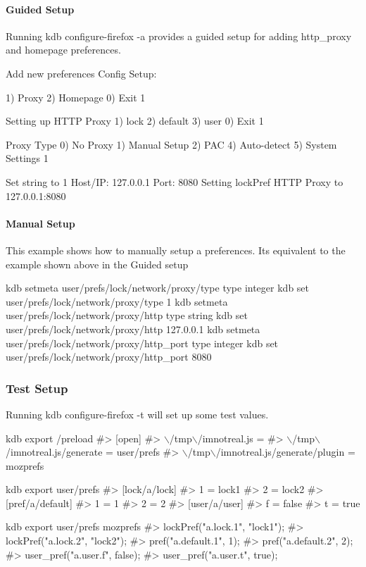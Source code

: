 \paragraph*{Guided Setup}

Running {\ttfamily kdb configure-\/firefox -\/a} provides a guided setup for adding http\+\_\+proxy and homepage preferences.


\begin{DoxyCode}
Add new preferences
Config Setup:

1) Proxy
2) Homepage
0) Exit
1

Setting up HTTP Proxy
1) lock
2) default
3) user
0) Exit
1

Proxy Type
0) No Proxy
1) Manual Setup
2) PAC
4) Auto-detect
5) System Settings
1

Set string to 1
Host/IP: 127.0.0.1
Port: 8080
Setting lockPref HTTP Proxy to 127.0.0.1:8080
\end{DoxyCode}


\paragraph*{Manual Setup}

This example shows how to manually setup a preferences. It\textquotesingle{}s equivalent to the example shown above in the {\ttfamily Guided setup}


\begin{DoxyCode}
kdb setmeta user/prefs/lock/network/proxy/type type integer
kdb set user/prefs/lock/network/proxy/type 1
kdb setmeta user/prefs/lock/network/proxy/http type string
kdb set user/prefs/lock/network/proxy/http 127.0.0.1
kdb setmeta user/prefs/lock/network/proxy/http\_port type integer
kdb set user/prefs/lock/network/proxy/http\_port 8080
\end{DoxyCode}


\subsubsection*{Test Setup}

Running {\ttfamily kdb configure-\/firefox -\/t} will set up some test values.


\begin{DoxyCode}
kdb export /preload
#> [open]
#> \(\backslash\)/tmp\(\backslash\)/imnotreal.js =
#> \(\backslash\)/tmp\(\backslash\)/imnotreal.js/generate = user/prefs
#> \(\backslash\)/tmp\(\backslash\)/imnotreal.js/generate/plugin = mozprefs

kdb export user/prefs
#> [lock/a/lock]
#> 1 = lock1
#> 2 = lock2
#> [pref/a/default]
#> 1 = 1
#> 2 = 2
#> [user/a/user]
#> f = false
#> t = true

kdb export user/prefs mozprefs
#> lockPref("a.lock.1", "lock1");
#> lockPref("a.lock.2", "lock2");
#> pref("a.default.1", 1);
#> pref("a.default.2", 2);
#> user\_pref("a.user.f", false);
#> user\_pref("a.user.t", true);
\end{DoxyCode}



